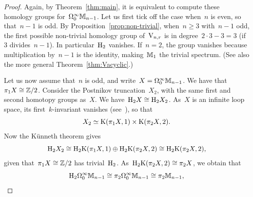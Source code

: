 \begin{proof}
Again, by Theorem~\ref{thm:main}, it is equivalent to compute these homology groups for~$\Omega^\infty_0\mathbb{M}_{n-1}$. 
Let us first tick off the case when~$n$ is even, so that~$n-1$ is odd. 
By Proposition~\ref{prop:non-trivial}, when~$n\geqslant 3$ with~$n-1$ odd, the first possible non-trivial homology group of~$\mathrm{V}_{n,r}$ is in degree~$2\cdot 3-3=3$ (if~$3$ divides~$n-1$). In particular~$\mathrm{H}_2$ vanishes. 
If~$n=2$, the group vanishes because multiplication by~$n-1$ is the identity, making~$\mathbb{M}_1$ the trivial spectrum. (See also the more general Theorem~\ref{thm:Vacyclic}.) 

Let us now assume that~$n$ is odd, and write~$X=\Omega^\infty_0\mathbb{M}_{n-1}$. We have that~$\pi_1X\cong \mathbb{Z}/2$. Consider the Postnikov truncation~$X_2$, with the same first and second homotopy groups as~$X$. We have~\hbox{$\mathrm{H}_2X\cong\mathrm{H}_2X_2$}. As~$X$ is an infinite loop space, its first~$k$-invariant vanishes (see~\cite{Arlettaz}), so that 
\[
X_2\simeq \mathrm{K}(\pi_1X,1)\times \mathrm{K}(\pi_2X,2).
\] 
Now the K\"unneth theorem gives
\[
\mathrm{H}_2X_2 \cong  \mathrm{H}_2\mathrm{K}(\pi_1X,1) \oplus \mathrm{H}_2\mathrm{K}(\pi_2X,2) \cong  \mathrm{H}_2\mathrm{K}(\pi_2X,2),
\]
given that~$ \pi_1X\cong \mathbb{Z}/2$ has trivial~$\mathrm{H}_2$. As~$\mathrm{H}_2\mathrm{K}(\pi_2X,2)\cong \pi_2X$, we obtain that 
\[
\mathrm{H}_2\Omega^\infty_0\mathbb{M}_{n-1}\cong \pi_2\Omega^\infty_0\mathbb{M}_{n-1}\cong \pi_2\mathbb{M}_{n-1},
\]

\end{proof}
